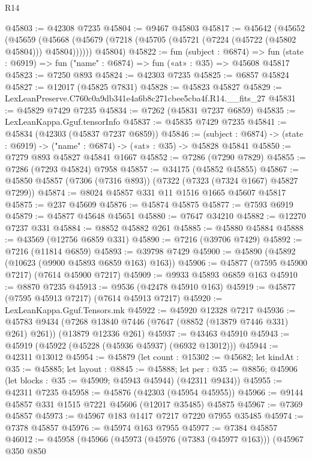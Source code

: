 \begin{lexlean}{R14}
\begin{coremodule}
@45803 := @42308 @7235
@45804 := @9467 @45803
@45817 := @45642
    (@45652
      (@45659 (@45668 (@45679 (@7218 (@45705 (@45721 (@7224 (@45722 (@45802 @45804))) @45804))))))
      @45804)
@45822 := fun (subject : @6874) =>
  fun (state : @6919) => fun ("name" : @6874) => fun («at» : @35) => @45608 @45817
@45823 := @7250 @893
@45824 := @42303 @7235
@45825 := @6857 @45824
@45827 := @12017 (@45825 @7831)
@45828 := @45823 @45827
@45829 := LexLeanPreserve.C760c0a9db341e4a6b8c271cbee5cba4f.R14.__fits_27
@45831 := @45829 @7429 @7235
@45834 := @7262 (@45831 @7237 @6859)
@45835 := LexLeanKappa.Gguf.tensorInfo
@45837 := @45835 @7429 @7235
@45841 := @45834 (@42303 (@45837 @7237 @6859))
@45846 := (subject : @6874) -> (state : @6919) -> ("name" : @6874) -> («at» : @35) -> @45828 @45841
@45850 := @7279 @893 @45827 @45841 @1667
@45852 := @7286 (@7290 @7829)
@45855 := @7286 (@7293 @45824) @7958
@45857 := @34175 (@45852 @45855)
@45867 := @45850 @45857 (@7306 (@7316 @893)) (@7322 (@7323 (@7324 @1667) @45827 @7299))
@45874 := @8024 @45857 @331 @11 @1516 @1665 @45607 @45817
@45875 := @237 @45609
@45876 := @45874 @45875
@45877 := @7593 @6919
@45879 := @45877 @45648 @45651
@45880 := @7647 @34210
@45882 := @12270 @7237 @331
@45884 := @8852 @45882 @261
@45885 := @45880 @45884
@45888 := @43569 (@12756 @6859 @331)
@45890 := @7216 (@39706 @7429)
@45892 := @7216 (@11814 @6859)
@45893 := @39798 @7429
@45900 := @45890 (@45892 (@10623 (@9900 @45893 @6859 @163) @163))
@45906 := @45877 (@7595 @45900 @7217) (@7614 @45900 @7217)
@45909 := @9933 @45893 @6859 @163
@45910 := @8870 @7235
@45913 := @9536 (@42478 @45910 @163)
@45919 := @45877 (@7595 @45913 @7217) (@7614 @45913 @7217)
@45920 := LexLeanKappa.Gguf.Tensors.mk
@45922 := @45920 @12328 @7217
@45936 := @45783
    @9434
    (@7268 @13840 @7446 (@7647 (@8852 (@13879 @7446 @331) @261) @261))
    (@13879 @12336 @261)
@45937 := @43463 @45910
@45943 := @45919 (@45922 (@45228 (@45936 @45937) (@6932 @13012)))
@45944 := @42311 @13012
@45954 := @45879
    (let count : @15302 := @45682;
    let kindAt : @35 := @45885;
    let layout : @8845 := @45888;
    let per : @35 := @8856; @45906 (let blocks : @35 := @45909; @45943 @45944) (@42311 @9434))
@45955 := @42311 @7235
@45958 := @45876 (@42303 (@45954 @45955))
@45966 := @9144 @45857 @331 @1515 @7221 @45606 (@12017 @35485) @45875
@45967 := @7369 @45857
@45973 := @45967 @183 @1417 @7217 @7220 @7955 @35485
@45974 := @7378 @45857
@45976 := @45974 @163 @7955
@45977 := @7384 @45857
@46012 := @45958
    (@45966
      (@45973
        (@45976 (@7383 (@45977 @163)))
        (@45967
          @350
          @850

\end{coremodule}
\end{lexlean}

